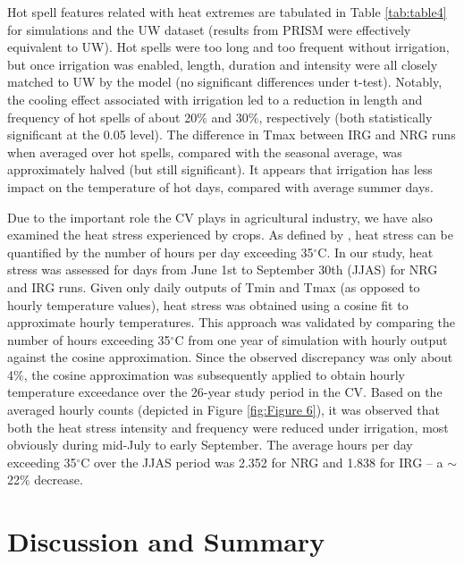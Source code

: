 \documentclass[draft,ms]{agutex}   %
\begin{document}
\begin{article}
Hot spell features related with heat extremes are tabulated in Table \ref{tab:table4} for simulations and the UW dataset (results from PRISM were effectively equivalent to UW). Hot spells were too long and too frequent without irrigation, but once irrigation was enabled, length, duration and intensity were all closely matched to UW by the model (no significant differences under t-test). Notably, the cooling effect associated with irrigation led to a reduction in length and frequency of hot spells of about 20$\%$ and 30$\%$, respectively (both statistically significant at the 0.05 level). The difference in Tmax between IRG and NRG runs when averaged over hot spells, compared with the seasonal average, was approximately halved (but still significant). It appears that irrigation has less impact on the temperature of hot days, compared with average summer days.


Due to the important role the CV plays in agricultural industry, we have also examined the heat stress experienced by crops. As defined by \cite{teixeira2013global}, heat stress can be quantified by the number of hours per day exceeding 35$^\circ$C. In our study, heat stress was assessed for days from June 1st to September 30th (JJAS) for NRG and IRG runs. Given only daily outputs of Tmin and Tmax (as opposed to hourly temperature values), heat stress was obtained using a cosine fit to approximate hourly temperatures. This approach was validated by comparing the number of hours exceeding 35$^\circ$C from one year of simulation with hourly output against the cosine approximation. Since the observed discrepancy was only about 4$\%$, the cosine approximation was subsequently applied to obtain hourly temperature exceedance over the 26-year study period in the CV. Based on the averaged hourly counts (depicted in Figure \ref{fig:Figure 6}), it was observed that both the heat stress intensity and frequency were reduced under irrigation, most obviously during mid-July to early September. The average hours per day exceeding 35$^\circ$C over the JJAS period was 2.352 for NRG and 1.838 for IRG -- a $\sim$22$\%$ decrease.


\section{Discussion and Summary}


\end{article}
\end{document}
